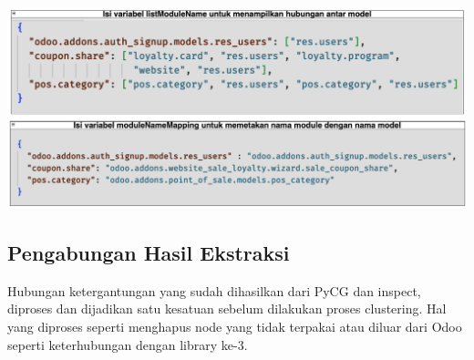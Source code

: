 \begin{center}
	\includegraphics[width=14cm]{img/bab_4/def_inspect_4.png}
	\label{fig:def_inspect_4}
\end{center}

\subsection{Pengabungan Hasil Ekstraksi}
Hubungan ketergantungan yang sudah dihasilkan dari PyCG dan inspect, diproses dan dijadikan satu kesatuan sebelum dilakukan proses clustering. Hal yang diproses seperti menghapus node yang tidak terpakai atau diluar dari Odoo seperti keterhubungan dengan library ke-3.  

